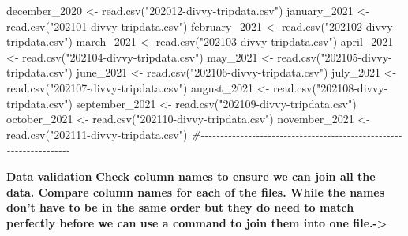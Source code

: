 \documentclass[
]{article}
\newenvironment{Shaded}{\begin{snugshade}}{\end{snugshade}}
\newcommand{\CommentTok}[1]{\textcolor[rgb]{0.56,0.35,0.01}{\textit{#1}}}
\newcommand{\FunctionTok}[1]{\textcolor[rgb]{0.00,0.00,0.00}{#1}}
\newcommand{\NormalTok}[1]{#1}
\newcommand{\OtherTok}[1]{\textcolor[rgb]{0.56,0.35,0.01}{#1}}
\newcommand{\StringTok}[1]{\textcolor[rgb]{0.31,0.60,0.02}{#1}}
\begin{document}
\begin{Shaded}
\begin{Highlighting}[]
\NormalTok{december\_2020 }\OtherTok{\textless{}{-}} \FunctionTok{read.csv}\NormalTok{(}\StringTok{"202012{-}divvy{-}tripdata.csv"}\NormalTok{)}
\NormalTok{january\_2021 }\OtherTok{\textless{}{-}} \FunctionTok{read.csv}\NormalTok{(}\StringTok{"202101{-}divvy{-}tripdata.csv"}\NormalTok{)}
\NormalTok{february\_2021 }\OtherTok{\textless{}{-}} \FunctionTok{read.csv}\NormalTok{(}\StringTok{"202102{-}divvy{-}tripdata.csv"}\NormalTok{)}
\NormalTok{march\_2021 }\OtherTok{\textless{}{-}} \FunctionTok{read.csv}\NormalTok{(}\StringTok{"202103{-}divvy{-}tripdata.csv"}\NormalTok{)}
\NormalTok{april\_2021 }\OtherTok{\textless{}{-}} \FunctionTok{read.csv}\NormalTok{(}\StringTok{"202104{-}divvy{-}tripdata.csv"}\NormalTok{)}
\NormalTok{may\_2021 }\OtherTok{\textless{}{-}} \FunctionTok{read.csv}\NormalTok{(}\StringTok{"202105{-}divvy{-}tripdata.csv"}\NormalTok{) }
\NormalTok{june\_2021 }\OtherTok{\textless{}{-}} \FunctionTok{read.csv}\NormalTok{(}\StringTok{"202106{-}divvy{-}tripdata.csv"}\NormalTok{)}
\NormalTok{july\_2021 }\OtherTok{\textless{}{-}} \FunctionTok{read.csv}\NormalTok{(}\StringTok{"202107{-}divvy{-}tripdata.csv"}\NormalTok{)}
\NormalTok{august\_2021 }\OtherTok{\textless{}{-}} \FunctionTok{read.csv}\NormalTok{(}\StringTok{"202108{-}divvy{-}tripdata.csv"}\NormalTok{)}
\NormalTok{september\_2021 }\OtherTok{\textless{}{-}} \FunctionTok{read.csv}\NormalTok{(}\StringTok{"202109{-}divvy{-}tripdata.csv"}\NormalTok{)}
\NormalTok{october\_2021 }\OtherTok{\textless{}{-}} \FunctionTok{read.csv}\NormalTok{(}\StringTok{"202110{-}divvy{-}tripdata.csv"}\NormalTok{)}
\NormalTok{november\_2021 }\OtherTok{\textless{}{-}} \FunctionTok{read.csv}\NormalTok{(}\StringTok{"202111{-}divvy{-}tripdata.csv"}\NormalTok{)}
\CommentTok{\#{-}{-}{-}{-}{-}{-}{-}{-}{-}{-}{-}{-}{-}{-}{-}{-}{-}{-}{-}{-}{-}{-}{-}{-}{-}{-}{-}{-}{-}{-}{-}{-}{-}{-}{-}{-}{-}{-}{-}{-}{-}{-}{-}{-}{-}{-}{-}{-}{-}{-}{-}{-}{-}{-}{-}{-}{-}{-}{-}{-}{-}{-}{-}{-}{-}{-}{-}}
\end{Highlighting}
\end{Shaded}

\textbf{Data validation} \textbf{Check column names to ensure we can
join all the data. Compare column names for each of the files. While the
names don't have to be in the same order but they do need to match
perfectly before we can use a command to join them into one
file.-\textgreater{}}
\end{document}
